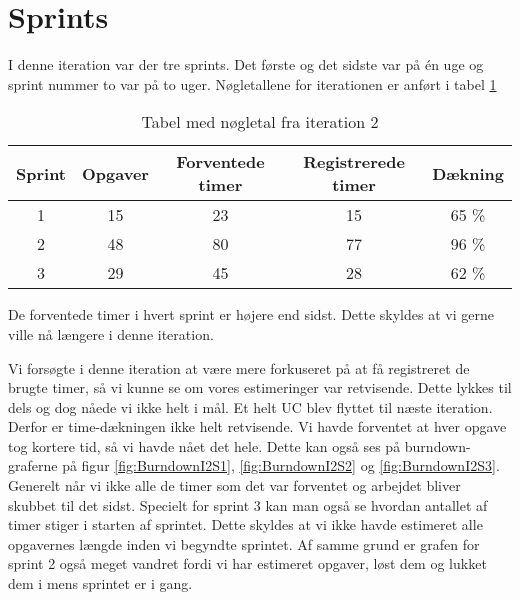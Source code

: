 \section{Sprints}

I denne iteration var der tre sprints. Det første og det sidste var på én uge og sprint nummer to var på to uger.
Nøgletallene for iterationen er anført i tabel \ref{table:iteration2sprints}

\begin{table}
\centering
\begin{tabular}{|c|c|c|c|c|}
\hline 
\textbf{Sprint} 	& \textbf{Opgaver} 	& \textbf{Forventede timer} 	& \textbf{Registrerede timer} 	& \textbf{Dækning} \\ 
\hline
1 		& 15 		& 23 				& 15						& 65 \% \\ 
\hline 
2 		& 48 		& 80 				& 77						& 96 \% \\ 
\hline 
3 		& 29 		& 45 				& 28						& 62 \% \\ 
\hline 
\end{tabular}
\caption{Tabel med nøgletal fra iteration 2}
\label{table:iteration2sprints}
\end{table}

De forventede timer i hvert sprint er højere end sidst. Dette skyldes at vi gerne ville nå længere i denne iteration.

Vi forsøgte i denne iteration at være mere forkuseret på at få registreret de brugte timer, så vi kunne se om vores estimeringer var retvisende. Dette lykkes til dels og dog nåede vi ikke helt i mål. Et helt UC blev flyttet til næste iteration. Derfor er time-dækningen ikke helt retvisende. Vi havde forventet at hver opgave tog kortere tid, så vi havde nået det hele. Dette kan også ses på burndown-graferne på figur \ref{fig:BurndownI2S1}, \ref{fig:BurndownI2S2} og \ref{fig:BurndownI2S3}. Generelt når vi ikke alle de timer som det var forventet og arbejdet bliver skubbet til det sidst.
Specielt for sprint 3 kan man også se hvordan antallet af timer stiger i starten af sprintet. Dette skyldes at vi ikke havde estimeret alle opgavernes længde inden vi begyndte sprintet. Af samme grund er grafen for sprint 2 også meget vandret fordi vi har estimeret opgaver, løst dem og lukket dem i mens sprintet er i gang.

\begin{minipage}{0.5\textwidth}
\end{minipage}
\begin{minipage}{0.5\textwidth}
\end{minipage}
